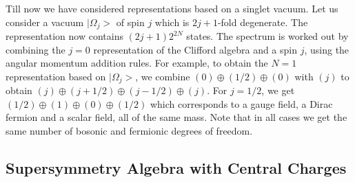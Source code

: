 Till now we have considered representations based on a singlet vacuum.
Let us consider a vacuum $|\Omega_j>$ of spin $j$ which is $2j+1$-fold
degenerate. The representation now contains $(2j+1)2^{2N}$ states. The
spectrum is worked out by combining the $j=0$ representation of the
Clifford algebra and a spin $j$, using the angular momentum addition
rules. For example, to obtain the $N=1$ representation based on
$|\Omega_j>$, we combine $(0)\oplus(1/2)\oplus (0)$ with $(j)$ to
obtain $(j)\oplus(j+1/2)\oplus(j-1/2)\oplus(j)$.  For $j=1/2$, we get
$(1/2)\oplus(1)\oplus(0)\oplus(1/2)$ which corresponds to a gauge
field, a Dirac fermion and a scalar field, all of the same mass.  Note
that in all cases we get the same number of bosonic and fermionic
degrees of freedom.

\subsection{Supersymmetry Algebra with Central Charges}
 
